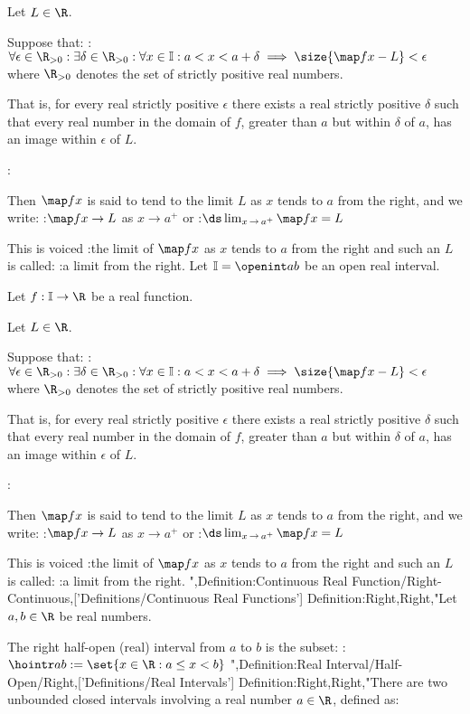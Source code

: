 Let $L \in \R$.


Suppose that:
:$\forall \epsilon \in \R_{>0}: \exists \delta \in \R_{>0}: \forall x \in \Bbb I: a < x < a + \delta \implies \size {\map f x - L} < \epsilon$
where $\R_{>0}$ denotes the set of strictly positive real numbers.

That is, for every real strictly positive $\epsilon$ there exists a real strictly positive $\delta$ such that every real number in the domain of $f$, greater than $a$ but within $\delta$ of $a$, has an image within $\epsilon$ of $L$.


:

Then $\map f x$ is said to tend to the limit $L$ as $x$ tends to $a$ from the right, and we write:
:$\map f x \to L$ as $x \to a^+$
or
:$\ds \lim_{x \mathop \to a^+} \map f x = L$


This is voiced
:the limit of $\map f x$ as $x$ tends to $a$ from the right
and such an $L$ is called:
:a limit from the right.
Let $\Bbb I = \openint a b$ be an open real interval.

Let $f: \Bbb I \to \R$ be a real function.

Let $L \in \R$.


Suppose that:
:$\forall \epsilon \in \R_{>0}: \exists \delta \in \R_{>0}: \forall x \in \Bbb I: a < x < a + \delta \implies \size {\map f x - L} < \epsilon$
where $\R_{>0}$ denotes the set of strictly positive real numbers.

That is, for every real strictly positive $\epsilon$ there exists a real strictly positive $\delta$ such that every real number in the domain of $f$, greater than $a$ but within $\delta$ of $a$, has an image within $\epsilon$ of $L$.


:

Then $\map f x$ is said to tend to the limit $L$ as $x$ tends to $a$ from the right, and we write:
:$\map f x \to L$ as $x \to a^+$
or
:$\ds \lim_{x \mathop \to a^+} \map f x = L$


This is voiced
:the limit of $\map f x$ as $x$ tends to $a$ from the right
and such an $L$ is called:
:a limit from the right.
",Definition:Continuous Real Function/Right-Continuous,['Definitions/Continuous Real Functions']
Definition:Right,Right,"Let $a, b \in \R$ be real numbers.


The right half-open (real) interval from $a$ to $b$ is the subset:
:$\hointr a b := \set {x \in \R: a \le x < b}$
",Definition:Real Interval/Half-Open/Right,['Definitions/Real Intervals']
Definition:Right,Right,"There are two unbounded closed intervals involving a real number $a \in \R$, defined as:




